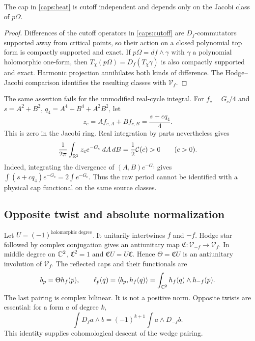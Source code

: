 \begin{proposition}\label{caps:descent}
The cap in \eqref{caps:heat} is cutoff independent and depends only
on the Jacobi class of $p\Omega$.
\end{proposition}
\begin{proof}
Differences of the cutoff operators in \eqref{caps:cutoff} are
$D_f$-commutators supported away from critical points, so their
action on a closed polynomial top form is compactly supported and
exact. If $p\Omega=df\wedge\gamma$ with $\gamma$ a polynomial
holomorphic one-form, then
$T_\chi(p\Omega)=D_f(T_\chi\gamma)$ is also compactly supported and
exact. Harmonic projection annihilates both kinds of difference.
The Hodge--Jacobi comparison identifies the resulting classes with
$\mathcal V_f$.
\end{proof}

The same assertion fails for the unmodified real-cycle integral.
For $f_c=G_c/4$ and $s=A^2+B^2$, $q_4=A^4+B^4+A^2B^2$, let
\[
z_c=Af_{c,A}+Bf_{c,B}=\frac{s+cq_4}{4}.
\]
This is zero in the Jacobi ring. Real integration by parts nevertheless
gives
\[
\frac1{2\pi}\int_{\mathbb R^2}z_c e^{-G_c}\,dA\,dB
   =\frac12 \mathcal C(c)>0\qquad(c>0).
\]
Indeed, integrating the divergence of $(A,B)e^{-G_c}$ gives
$\int (s+cq_4)e^{-G_c}=2\int e^{-G_c}$. Thus the raw period cannot
be identified with a physical cap functional on the same source
classes.

\subsection{Opposite twist and absolute normalization}
Let $U=(-1)^{\text{holomorphic degree}}$. It unitarily intertwines
$f$ and $-f$. Hodge star followed by complex conjugation gives an
antiunitary map $\mathfrak C:\mathcal V_{-f}\to\mathcal V_f$.
In middle degree on $\mathbb C^2$, $\mathfrak C^2=1$ and
$\mathfrak C U=U\mathfrak C$. Hence
$\Theta=\mathfrak C U$ is an antiunitary involution of $\mathcal V_f$.
The reflected caps and their functionals are
\begin{equation}\label{caps:reflection}
b_p=\Theta h_f(p),\qquad
\ell_p(q)=\left\langle b_p,h_f(q)\right\rangle
 =\int_{\mathbb C^2}h_f(q)\wedge h_{-f}(p).
\end{equation}
The last pairing is complex bilinear. It is not a positive norm.
Opposite twists are essential: for a form $a$ of degree $k$,
\[
\int D_fa\wedge b=(-1)^{k+1}\int a\wedge D_{-f}b.
\]
This identity supplies cohomological descent of the wedge pairing.

